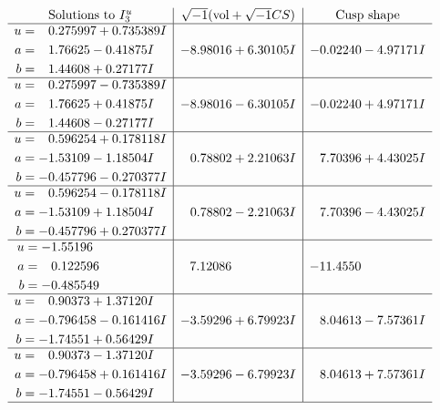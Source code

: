 \documentclass[1p]{elsarticle_modified}
\theoremstyle{definition}
\newcommand{\I}{\sqrt{-1}}
\begin{document}
$$\begin{array}{c|c|c}  
\text{Solutions to }I^u_{3}& \I (\text{vol} + \sqrt{-1}CS) & \text{Cusp shape}\\
 \hline 
\begin{aligned}
u &= \phantom{-}0.275997 + 0.735389 I \\
a &= \phantom{-}1.76625 - 0.41875 I \\
b &= \phantom{-}1.44608 + 0.27177 I\end{aligned}
 & -8.98016 + 6.30105 I & -0.02240 - 4.97171 I \\ \hline\begin{aligned}
u &= \phantom{-}0.275997 - 0.735389 I \\
a &= \phantom{-}1.76625 + 0.41875 I \\
b &= \phantom{-}1.44608 - 0.27177 I\end{aligned}
 & -8.98016 - 6.30105 I & -0.02240 + 4.97171 I \\ \hline\begin{aligned}
u &= \phantom{-}0.596254 + 0.178118 I \\
a &= -1.53109 - 1.18504 I \\
b &= -0.457796 - 0.270377 I\end{aligned}
 & \phantom{-}0.78802 + 2.21063 I & \phantom{-}7.70396 + 4.43025 I \\ \hline\begin{aligned}
u &= \phantom{-}0.596254 - 0.178118 I \\
a &= -1.53109 + 1.18504 I \\
b &= -0.457796 + 0.270377 I\end{aligned}
 & \phantom{-}0.78802 - 2.21063 I & \phantom{-}7.70396 - 4.43025 I \\ \hline\begin{aligned}
u &= -1.55196\phantom{ +0.000000I} \\
a &= \phantom{-}0.122596\phantom{ +0.000000I} \\
b &= -0.485549\phantom{ +0.000000I}\end{aligned}
 & \phantom{-}7.12086\phantom{ +0.000000I} & -11.4550\phantom{ +0.000000I} \\ \hline\begin{aligned}
u &= \phantom{-}0.90373 + 1.37120 I \\
a &= -0.796458 - 0.161416 I \\
b &= -1.74551 + 0.56429 I\end{aligned}
 & -3.59296 + 6.79923 I & \phantom{-}8.04613 - 7.57361 I \\ \hline\begin{aligned}
u &= \phantom{-}0.90373 - 1.37120 I \\
a &= -0.796458 + 0.161416 I \\
b &= -1.74551 - 0.56429 I\end{aligned}
 & -3.59296 - 6.79923 I & \phantom{-}8.04613 + 7.57361 I\\
 \hline 
 \end{array}$$\newpage\newpage\renewcommand{\arraystretch}{1}
\end{document}
